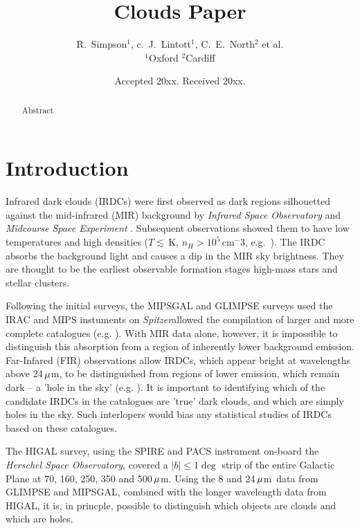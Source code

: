 \documentclass[a4,useAMS,usenatbib]{mn2e}
\title{Clouds Paper}
\author[The world]{R.~Simpson$^1$, c.~J.~Lintott$^1$, C.~E.~North$^2$ et al.
\\
$^1$Oxford
$^2$Cardiff
}
\def\spitzer{{\em Spitzer}}
\def\mic{$\umu$m}
\begin{document}
\date{Accepted 20xx. Received 20xx.}

\pagerange{\pageref{firstpage}--\pageref{lastpage}} 

\maketitle

\label{firstpage}

\begin{abstract}
Abstract
\end{abstract}

\section{Introduction}
Infrared dark clouds (IRDCs) were first observed as dark regions
silhouetted against the mid-infrared (MIR) background
\citep{Wilcock2012a} by \emph{Infrared Space Observatory} \citep{ISO}
and \emph{Midcourse Space Experiment} \citep{ISO}. Subsequent
observations showed them to have low temperatures and high densities
($T\lesssim$\,K, $n_H > 10^5$\,cm$^-3$,
e.g.~\citet{Egan98,Carey98,HennebellePerault02}). The IRDC absorbs the
background light and causes a dip in the MIR sky brightness. They are
thought to be the earliest observable formation stages high-mass stars
and stellar clusters.

Following the initial surveys, the MIPSGAL and GLIMPSE surveys used
the IRAC and MIPS instuments on \spitzer allowed the compilation of
larger and more complete catalogues (e.g. \citet{PF09}). With MIR data
alone, however, it is impossible to distinguish this absorption from a
region of inherently lower background emission. Far-Infared (FIR)
observations allow IRDCs, which appear bright at wavelengths above
24\,\mic, to be distinguished from regions of lower emission, which
remain dark -- a 'hole in the sky'
(e.g. \citet{Stanke2010_NGC1999}). It is important to identifying
which of the candidate IRDCs in the catalogues are 'true' dark clouds,
and which are simply holes in the sky. Such interlopers would bias any
statistical studies of IRDCs based on these catalogues.

The HIGAL survey, using the SPIRE and PACS instrument on-board
the \emph{Herschel Space Observatory}, covered a $|b|\le 1\deg$ strip
of the entire Galactic Plane at 70, 160, 250, 350 and 500\,\mic. Using
the 8 and 24\,\mic\ data from GLIMPSE and MIPSGAL, combined with the
longer wavelength data from HIGAL, it is, in princple, possible to
distinguish which objects are clouds and which are holes.
\end{document}
